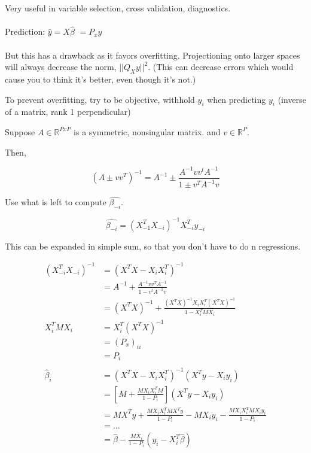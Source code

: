 \documentclass[11pt,fleqn]{book} %
\begin{document}
Very useful in variable selection, cross validation, diagnostics.\\
\\ 
Prediction: $\hat{y} = X \hat{\beta}$
	$= P_x y$\\
\\
But this has a drawback as it favors overfitting. Projectioning onto larger spaces will always decrease the norm,  $||Q_Xy ||^2$. (This can decrease errors which would cause you to think it's better, even though it's not.)

To prevent overfitting, try to be objective, withhold $y_i$ when predicting $y_i$ (inverse of a matrix, rank 1 perpendicular)

\begin{theorem}
	Suppose $A \in \mathbb{R}^{PxP}$ is a symmetric, nonsingular matrix. and $v \in \mathbb{R}^P$. 

	Then, 

	$$(A \pm vv^T)^{-1} = A^{-1} \pm \frac{A^{-1}vv^t A^{-1}}{1 \pm v^TA^{-1}v}$$
\end{theorem}


Use what is left to compute $\hat{\beta_{-i}}$.

$$\hat{\beta_{-i}} = (X^T_{-1}X_{-i})^{-1}X^T_{-i} y_{-i}$$

This can be expanded in simple sum, so that you don't have to do n regressions.

\begin{align*}
	(X^T_{-i} X_{-i})^{-1} &= (X^TX-X_iX_i^T)^{-1}\\
	&=A^{-1} + \frac{A^{-1}v v^T A^{-1}}{1 - v^t A^{-1} v}\\
	&=(X^T X)^{-1} + \frac{(X^TX)^{-1}X_i X_i^T (X^TX)^{-1}}{1 - X^T_i M X_i}\\
	X_i^T M X_i &= X_i^T (X^T X)^{-1}  \\
	&= (P_x)_{ii}\\
	&= P_i\\
	\\
	\hat{\beta}_i &= (X^TX - X_iX_i^T)^{-1} (X^T y - X_i y_i)\\
	&= [M + \frac{M X_i X_i^T M}{1 - P_i}] (X^T y - X_i y_i)\\
	&= M X^T y + \frac{M X_i X_i^T M X^T y}{1 - P_i} - M X_iy_i - \frac{M X_i X_i^T M X_i y_i}{1 - P_i}\\
	&= \dots\\
	&= \hat{\beta} - \frac{M X_i}{1 - P_i}(y_i - X_i^T \hat{\beta})
\end{align*}
\end{document}

